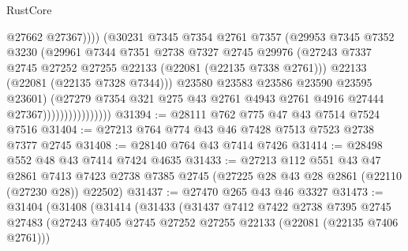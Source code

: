 \begin{lexlean}{RustCore}
\begin{coremodule}
                                        @27662
                                        @27367))))
                                (@30231
                                  @7345
                                  @7354
                                  @2761
                                  @7357
                                  (@29953
                                    @7345
                                    @7352
                                    @3230
                                    (@29961
                                      @7344
                                      @7351
                                      @2738
                                      @7327
                                      @2745
                                      @29976
                                      (@27243
                                        @7337
                                        @2745
                                        @27252
                                        @27255
                                        @22133
                                        (@22081 (@22135 @7338 @2761)))
                                      @22133
                                      (@22081 (@22135 @7328 @7344)))
                                    @23580
                                    @23583
                                    @23586
                                    @23590
                                    @23595
                                    @23601)
                                  (@27279
                                    @7354
                                    @321
                                    @275
                                    @43
                                    @2761
                                    @4943
                                    @2761
                                    @4916
                                    @27444
                                    @27367))))))))))))))))
@31394 := @28111 @762 @775 @47 @43 @7514 @7524 @7516
@31404 := @27213 @764 @774 @43 @46 @7428 @7513 @7523 @2738 @7377 @2745
@31408 := @28140 @764 @43 @7414 @7426
@31414 := @28498 @552 @48 @43 @7414 @7424 @4635
@31433 := @27213
    @112
    @551
    @43
    @47
    @2861
    @7413
    @7423
    @2738
    @7385
    @2745
    (@27225 @28 @43 @28 @2861 (@22110 (@27230 @28)) @22502)
@31437 := @27470 @265 @43 @46 @3327
@31473 := @31404
    (@31408
      (@31414
        (@31433
          (@31437
            @7412
            @7422
            @2738
            @7395
            @2745
            @27483
            (@27243 @7405 @2745 @27252 @27255 @22133 (@22081 (@22135 @7406 @2761)))

\end{coremodule}
\end{lexlean}
